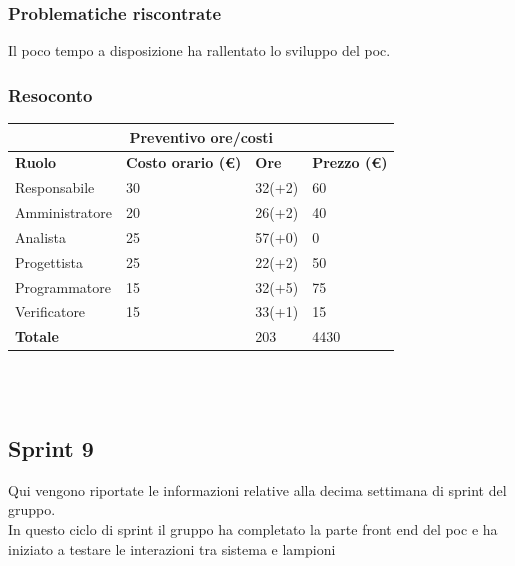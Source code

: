 \documentclass[12pt]{article}
\begin{document}
\subsubsection{Problematiche riscontrate}
Il poco tempo a disposizione ha rallentato lo sviluppo del poc.

\subsubsection{Resoconto}
\begin{center}
	\begin{tabularx}{\textwidth}{|X|X|X|X|}
		\hline
		\multicolumn{4}{|c|}{\textbf{Preventivo ore/costi}}                                      \\
		\hline
		\hline
		\textbf{Ruolo}  & \textbf{Costo orario (\euro)} & \textbf{Ore} & \textbf{Prezzo (\euro)} \\
		\hline
		Responsabile    & 30                            & 32(+2)       & 60                      \\
		\hline
		Amministratore  & 20                            & 26(+2)       & 40                      \\
		\hline
		Analista        & 25                            & 57(+0)       & 0                       \\
		\hline
		Progettista     & 25                            & 22(+2)       & 50                      \\
		\hline
		Programmatore   & 15                            & 32(+5)       & 75                      \\
		\hline
		Verificatore    & 15                            & 33(+1)       & 15                      \\
		\hline
		\hline
		\textbf{Totale} &                               & 203          & 4430                    \\
		\hline
	\end{tabularx}\\[8pt]
	\mbox{}\\
\end{center}


\subsection{Sprint 9}
Qui vengono riportate le informazioni relative alla decima settimana di sprint del gruppo. \\
In questo ciclo di sprint il gruppo ha completato la parte front end del poc e ha iniziato a testare le interazioni tra sistema e lampioni \\
\end{document}
